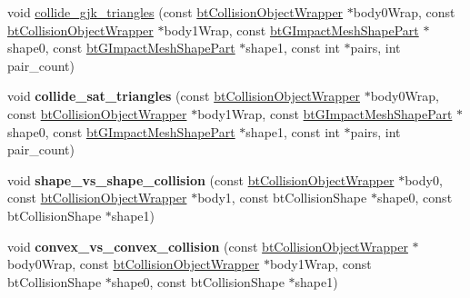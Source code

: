 \begin{DoxyCompactItemize}
\item 
void \hyperlink{classbt_g_impact_collision_algorithm_a1cc907bcb394f7a95d609b1b56a5490e}{collide\+\_\+gjk\+\_\+triangles} (const \hyperlink{structbt_collision_object_wrapper}{bt\+Collision\+Object\+Wrapper} $\ast$body0\+Wrap, const \hyperlink{structbt_collision_object_wrapper}{bt\+Collision\+Object\+Wrapper} $\ast$body1\+Wrap, const \hyperlink{classbt_g_impact_mesh_shape_part}{bt\+G\+Impact\+Mesh\+Shape\+Part} $\ast$shape0, const \hyperlink{classbt_g_impact_mesh_shape_part}{bt\+G\+Impact\+Mesh\+Shape\+Part} $\ast$shape1, const int $\ast$pairs, int pair\+\_\+count)
\item 
\hypertarget{classbt_g_impact_collision_algorithm_aa3e30a3764a7cdb764940b7ae1e86279}{void {\bfseries collide\+\_\+sat\+\_\+triangles} (const \hyperlink{structbt_collision_object_wrapper}{bt\+Collision\+Object\+Wrapper} $\ast$body0\+Wrap, const \hyperlink{structbt_collision_object_wrapper}{bt\+Collision\+Object\+Wrapper} $\ast$body1\+Wrap, const \hyperlink{classbt_g_impact_mesh_shape_part}{bt\+G\+Impact\+Mesh\+Shape\+Part} $\ast$shape0, const \hyperlink{classbt_g_impact_mesh_shape_part}{bt\+G\+Impact\+Mesh\+Shape\+Part} $\ast$shape1, const int $\ast$pairs, int pair\+\_\+count)}\label{classbt_g_impact_collision_algorithm_aa3e30a3764a7cdb764940b7ae1e86279}

\item 
\hypertarget{classbt_g_impact_collision_algorithm_ae7bcd385a621607be2ef6c1ee975ba9f}{void {\bfseries shape\+\_\+vs\+\_\+shape\+\_\+collision} (const \hyperlink{structbt_collision_object_wrapper}{bt\+Collision\+Object\+Wrapper} $\ast$body0, const \hyperlink{structbt_collision_object_wrapper}{bt\+Collision\+Object\+Wrapper} $\ast$body1, const bt\+Collision\+Shape $\ast$shape0, const bt\+Collision\+Shape $\ast$shape1)}\label{classbt_g_impact_collision_algorithm_ae7bcd385a621607be2ef6c1ee975ba9f}

\item 
\hypertarget{classbt_g_impact_collision_algorithm_a812b45921b8f0745454b5ed692e24dd0}{void {\bfseries convex\+\_\+vs\+\_\+convex\+\_\+collision} (const \hyperlink{structbt_collision_object_wrapper}{bt\+Collision\+Object\+Wrapper} $\ast$body0\+Wrap, const \hyperlink{structbt_collision_object_wrapper}{bt\+Collision\+Object\+Wrapper} $\ast$body1\+Wrap, const bt\+Collision\+Shape $\ast$shape0, const bt\+Collision\+Shape $\ast$shape1)}\label{classbt_g_impact_collision_algorithm_a812b45921b8f0745454b5ed692e24dd0}


\end{DoxyCompactItemize}
